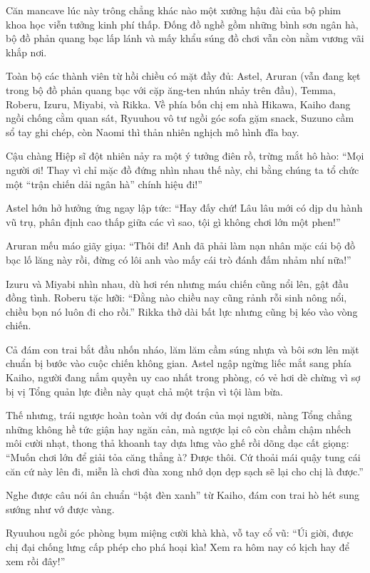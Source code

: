 \documentclass[../main.tex]{subfiles}
\begin{document}
Căn mancave lúc này trông chẳng khác nào một xưởng hậu đài của bộ phim khoa học viễn tưởng kinh phí thấp. Đống đồ nghề gồm những bình sơn ngân hà, bộ đồ phản quang bạc lấp lánh và mấy khẩu súng đồ chơi vẫn còn nằm vương vãi khắp nơi.

Toàn bộ các thành viên từ hồi chiều có mặt đầy đủ: Astel, Aruran (vẫn đang kẹt trong bộ đồ phản quang bạc với cặp ăng-ten nhún nhảy trên đầu), Temma, Roberu, Izuru, Miyabi, và Rikka. Về phía bốn chị em nhà Hikawa, Kaiho đang ngồi chống cằm quan sát, Ryuuhou vô tư ngồi góc sofa gặm snack, Suzuno cầm sổ tay ghi chép, còn Naomi thì thản nhiên nghịch mô hình đĩa bay.

Cậu chàng Hiệp sĩ đột nhiên nảy ra một ý tưởng điên rồ, trừng mắt hô hào: ``Mọi người ơi! Thay vì chỉ mặc đồ đứng nhìn nhau thế này, chi bằng chúng ta tổ chức một ``trận chiến dải ngân hà'' chính hiệu đi!''

Astel hớn hở hưởng ứng ngay lập tức: ``Hay đấy chứ! Lâu lâu mới có dịp du hành vũ trụ, phân định cao thấp giữa các vì sao, tội gì không chơi lớn một phen!''

Aruran mếu máo giãy giụa: ``Thôi đi! Anh đã phải làm nạn nhân mặc cái bộ đồ bạc lố lăng này rồi, đừng có lôi anh vào mấy cái trò đánh đấm nhảm nhí nữa!''

Izuru và Miyabi nhìn nhau, dù hơi rén nhưng máu chiến cũng nổi lên, gật đầu đồng tình. Roberu tặc lưỡi: ``Đằng nào chiều nay cũng rảnh rỗi sinh nông nổi, chiều bọn nó luôn đi cho rồi.'' Rikka thở dài bất lực nhưng cũng bị kéo vào vòng chiến.

Cả đám con trai bắt đầu nhốn nháo, lăm lăm cầm súng nhựa và bôi sơn lên mặt chuẩn bị bước vào cuộc chiến không gian. Astel ngập ngừng liếc mắt sang phía Kaiho, người đang nắm quyền uy cao nhất trong phòng, có vẻ hơi dè chừng vì sợ bị vị Tổng quản lực điền này quạt chả một trận vì tội làm bừa.

Thế nhưng, trái ngược hoàn toàn với dự đoán của mọi người, nàng Tổng chẳng những không hề tức giận hay ngăn cản, mà ngược lại cô còn chầm chậm nhếch môi cười nhạt, thong thả khoanh tay dựa lưng vào ghế rồi dõng dạc cất giọng: ``Muốn chơi lớn để giải tỏa căng thẳng à? Được thôi. Cứ thoải mái quậy tung cái căn cứ này lên đi, miễn là chơi đùa xong nhớ dọn dẹp sạch sẽ lại cho chị là được.''

Nghe được câu nói ân chuẩn ``bật đèn xanh'' từ Kaiho, đám con trai hò hét sung sướng như vớ được vàng.

Ryuuhou ngồi góc phòng bụm miệng cười khà khà, vỗ tay cổ vũ: ``Úi giời, được chị đại chống lưng cấp phép cho phá hoại kìa! Xem ra hôm nay có kịch hay để xem rồi đây!''
\end{document}
